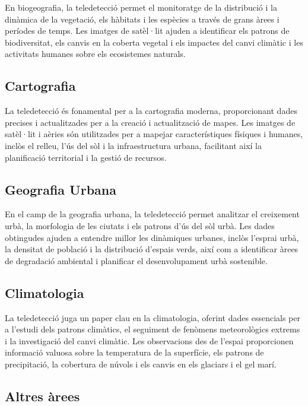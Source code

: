 \documentclass[
]{book}
\begin{document}
En biogeografia, la teledetecció permet el monitoratge de la distribució i la dinàmica de la vegetació, els hàbitats i les espècies a través de grans àrees i períodes de temps. Les imatges de satèl·lit ajuden a identificar els patrons de biodiversitat, els canvis en la coberta vegetal i els impactes del canvi climàtic i les activitats humanes sobre els ecosistemes naturals.

\hypertarget{cartografia}{%
\subsection{Cartografia}\label{cartografia}}

La teledetecció és fonamental per a la cartografia moderna, proporcionant dades precises i actualitzades per a la creació i actualització de mapes. Les imatges de satèl·lit i aèries són utilitzades per a mapejar característiques físiques i humanes, inclòs el relleu, l'ús del sòl i la infraestructura urbana, facilitant així la planificació territorial i la gestió de recursos.

\hypertarget{geografia-urbana}{%
\subsection{Geografia Urbana}\label{geografia-urbana}}

En el camp de la geografia urbana, la teledetecció permet analitzar el creixement urbà, la morfologia de les ciutats i els patrons d'ús del sòl urbà. Les dades obtingudes ajuden a entendre millor les dinàmiques urbanes, inclòs l'esprai urbà, la densitat de població i la distribució d'espais verds, així com a identificar àrees de degradació ambiental i planificar el desenvolupament urbà sostenible.

\hypertarget{climatologia}{%
\subsection{Climatologia}\label{climatologia}}

La teledetecció juga un paper clau en la climatologia, oferint dades essencials per a l'estudi dels patrons climàtics, el seguiment de fenòmens meteorològics extrems i la investigació del canvi climàtic. Les observacions des de l'espai proporcionen informació valuosa sobre la temperatura de la superfície, els patrons de precipitació, la cobertura de núvols i els canvis en els glaciars i el gel marí.

\hypertarget{altres-uxe0rees}{%
\subsection{Altres àrees}\label{altres-uxe0rees}}
\end{document}
